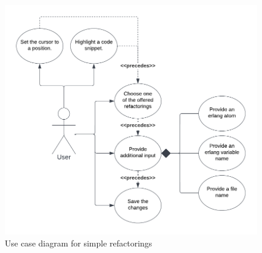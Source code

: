 \begin{figure}[H]
	\centering
	\includegraphics[width=1\textwidth]{images/use_case_1.png}
	\caption{Use case diagram for simple refactorings}
	\label{fig:usecase}
\end{figure}

